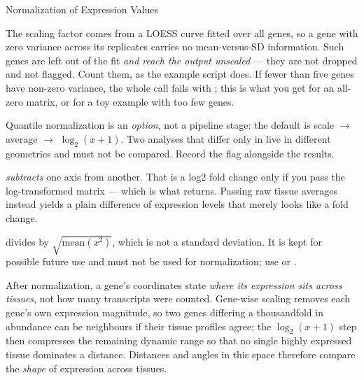 \begin{recipe}[label=sub:normalization]{Normalization of Expression Values}
\begin{pitfall}
  The scaling factor comes from a LOESS curve fitted over all genes, so a gene
  with zero variance across its replicates carries no mean-versus-SD
  information. Such genes are left out of the fit \emph{and reach the output
  unscaled} --- they are not dropped and not flagged. Count them, as the
  example script does. If fewer than five genes have non-zero variance, the
  whole call fails with ; this is
  what you get for an all-zero matrix, or for a toy example with too few
  genes.
\end{pitfall}

\begin{pitfall}
  Quantile normalization is an \emph{option}, not a pipeline stage: the
  default is scale $\rightarrow$ average $\rightarrow$ $\log_2(x+1)$. Two
  analyses that differ only in  live in different
  geometries and must not be compared. Record the flag alongside the results.
\end{pitfall}

\begin{pitfall}
   \emph{subtracts} one axis from another. That is a log2
  fold change only if you pass the log-transformed matrix --- which is what
   returns. Passing raw tissue averages instead
  yields a plain difference of expression levels that merely looks like a fold
  change.
\end{pitfall}

\begin{warning}
   divides by
  $\sqrt{\mathrm{mean}(x^2)}$, which is not a standard deviation. It is kept
  for possible future use and must not be used for normalization; use
   or .
\end{warning}

\begin{interpretation}
  After normalization, a gene's coordinates state \emph{where its expression
  sits across tissues}, not how many transcripts were counted. Gene-wise
  scaling removes each gene's own expression magnitude, so two genes differing
  a thousandfold in abundance can be neighbours if their tissue profiles agree;
  the $\log_2(x+1)$ step then compresses the remaining dynamic range so that no
  single highly expressed tissue dominates a distance. Distances and angles in
  this space therefore compare the \emph{shape} of expression across tissues.


\end{interpretation}
\end{recipe}
